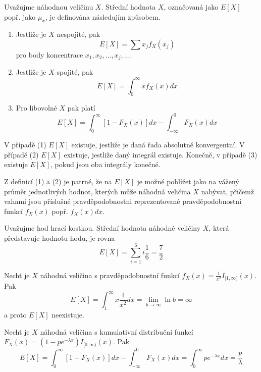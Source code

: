 \begin{definition}
Uvažujme náhodnou veličinu $X$. Střední hodnota $X$, označovaná jako $E[X]$ popř. jako $\mu_x$, je definována následujím způsobem.
\begin{enumerate}
\item Jestliže je $X$ nespojité, pak
\begin{equation*}
E[X] = \sum x_j f_X(x_j)
\end{equation*}
pro body koncentrace $x_1, x_2, ..., x_j, ...$.
\item Jestliže je $X$ spojité, pak
\begin{equation*}
E[X] = \int_0^{\infty}x f_X(x)dx
\end{equation*}
\item Pro libovolné $X$ pak platí
\begin{equation*}
E[X] = \int_0^{\infty}[1 - F_X(x)]dx - \int_{-\infty}^0 F_X(x)dx
\end{equation*}
\end{enumerate}
V případě (1) $E[X]$ existuje, jestliže je daná řada absolutně konvergentní. V případě (2) $E[X]$ existuje, jestliže daný integrál existuje. Konečně, v případě (3) existuje $E[X]$, pokud jsou oba integrály konečné.
\end{definition}

Z definicí (1) a (2) je patrné, že na $E[X]$ je možné pohlížet jako na vážený průměr jednotlivých hodnot, kterých může náhodná veličina $X$ nabývat, přičemž vahami jsou příslušné pravděpodobnostni reprezentované pravděpodobnostní funkcí $f_X(x)$ popř. $f_X(x)dx$.

\begin{example}
Uvažujme hod hrací kostkou. Střední hodnota náhodné veličiny $X$, která představuje hodnotu hodu, je rovna
\begin{equation*}
E[X] = \sum_{i = 1}^6 i \frac{1}{6} = \frac{7}{2}
\end{equation*}
\end{example}

\begin{example}
Nechť je $X$ náhodná veličina s pravděpodobnostní funkcí $f_X(x) = \frac{1}{x^2}I_{[1,\infty)}(x)$. Pak
\begin{equation*}
E[X] = \int_1^{\infty} x \frac{1}{x^2}dx=\lim_{b \rightarrow \infty} \ln b = \infty
\end{equation*}
a proto $E[X]$ neexistuje.
\end{example}

\begin{example}
Nechť je $X$ náhodná veličina s kumulativní distribuční funkcí $F_X(x) = (1 - pe^{-\lambda x})I_{[0, \infty)}(x)$. Pak
\begin{equation*}
E[X] = \int_0^{\infty} [1 - F_X(x)]dx - \int_{-\infty}^0F_X(x)dx = \int_0^{\infty} p e^{-\lambda x}dx = \frac{p}{\lambda}
\end{equation*}
\end{example}

